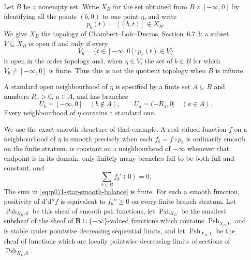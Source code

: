 
Let \(B\) be a nonempty set.  Write \(X_B\) for the set obtained from
\(B\times[-\infty,0]\) by identifying all the points \((b,0)\) to one
point \(\eta\), and write
\[
                    p_b(t)=[(b,t)]\in X_B .
\]
We give \(X_B\) the topology of Chambert--Loir--Ducros,
Section~6.7.3: a subset \(V\subseteq X_B\) is open if and only if every
\[
 V_b=\{t\in[-\infty,0]:p_b(t)\in V\}
\]
is open in the order topology and, when \(\eta\in V\), the set of
\(b\in B\) for which \(V_b\ne[-\infty,0]\) is finite.  Thus this is not
the quotient topology when \(B\) is infinite.

A standard open neighbourhood of \(\eta\) is specified by a finite set
\(A\subseteq B\) and numbers \(R_a>0\), \(a\in A\), and has branches
\begin{equation}
 U_b=[-\infty,0]\quad(b\notin A),
 \qquad
 U_a=(-R_a,0]\quad(a\in A).
 \label{eq:p071-star-standard-neighbourhood}
\end{equation}
Every neighbourhood of \(\eta\) contains a standard one.

We use the exact smooth structure of that example.  A real-valued
function \(f\) on a neighbourhood of \(\eta\) is smooth precisely when
each \(f_b=f\circ p_b\) is ordinarily smooth on the finite stratum,
is constant on a neighbourhood of \(-\infty\) whenever that endpoint is
in its domain, only finitely many branches fail to be both full and
constant, and
\begin{equation}
                         \sum_{b\in B} f_b'(0)=0 .
 \label{eq:p071-star-smooth-balance}
\end{equation}
The sum in \eqref{eq:p071-star-smooth-balance} is finite.  For such a
smooth function, positivity of
\(\mathrm d'\mathrm d''f\) is equivalent to \(f_b''\geq0\) on every
finite branch stratum.  Let
\(\operatorname{Psh}_{X_B,0}\) be this sheaf of smooth psh functions,
let \(\operatorname{Psh}_{X_B}\) be the smallest subsheaf of the sheaf
of \(\mathbf R\cup\{-\infty\}\)-valued functions which contains
\(\operatorname{Psh}_{X_B,0}\) and is stable under pointwise decreasing
sequential limits, and let \(\operatorname{Psh}_{X_B,1}\) be the sheaf
of functions which are locally pointwise decreasing limits of sections
of \(\operatorname{Psh}_{X_B,0}\).

